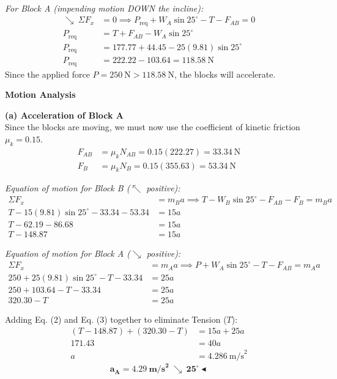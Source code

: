 \documentclass[12pt,a3paper]{article}
\begin{document}
\begin{enumerate}
\begin{tcolorbox}[enhanced,breakable,ansbox,colback=cG!4,colframe=cG,
  boxrule=0.8pt,arc=5pt,
  title={\textbf{Solution}},fonttitle=\bfseries\color{white},
  colbacktitle=cG]
\textit{For Block A (impending motion DOWN the incline):}
\begin{align*}
  \searrow\ \Sigma F_x &= 0 \implies P_{\text{req}} + W_A\sin 25^\circ - T - F_{AB} = 0 \\
  P_{\text{req}} &= T + F_{AB} - W_A\sin 25^\circ \\
  P_{\text{req}} &= 177.77 + 44.45 - 25(9.81)\sin 25^\circ \\
  P_{\text{req}} &= 222.22 - 103.64 = 118.58\ \text{N}
\end{align*}
Since the applied force $P = 250\ \text{N} > 118.58\ \text{N}$, the blocks will accelerate.

\vspace{0.5cm}
\textbf{Motion Analysis}

\textbf{(a) Acceleration of Block A} \\
Since the blocks are moving, we must now use the coefficient of kinetic friction $\mu_k = 0.15$.
\begin{align*}
  F_{AB} &= \mu_k N_{AB} = 0.15(222.27) = 33.34\ \text{N} \\
  F_B &= \mu_k N_B = 0.15(355.63) = 53.34\ \text{N}
\end{align*}

\textit{Equation of motion for Block B ($\nwarrow$ positive):}
\begin{align*}
  \Sigma F_x &= m_B a \implies T - W_B\sin 25^\circ - F_{AB} - F_B = m_B a \\
  T - 15(9.81)\sin 25^\circ - 33.34 - 53.34 &= 15 a \\
  T - 62.19 - 86.68 &= 15 a \\
  T - 148.87 &= 15 a \label{eq:2} \tag{2}
\end{align*}

\textit{Equation of motion for Block A ($\searrow$ positive):}
\begin{align*}
  \Sigma F_x &= m_A a \implies P + W_A\sin 25^\circ - T - F_{AB} = m_A a \\
  250 + 25(9.81)\sin 25^\circ - T - 33.34 &= 25 a \\
  250 + 103.64 - T - 33.34 &= 25 a \\
  320.30 - T &= 25 a \label{eq:3} \tag{3}
\end{align*}

Adding Eq. (2) and Eq. (3) together to eliminate Tension ($T$):
\begin{align*}
  (T - 148.87) + (320.30 - T) &= 15 a + 25 a \\
  171.43 &= 40 a \\
  a &= 4.286\ \text{m/s}^2
\end{align*}
\[
  \mathbf{a_A = 4.29\ \text{m/s}^2\ \searrow\ 25^\circ} \blacktriangleleft
\]


\end{tcolorbox}
\end{enumerate}
\end{document}
